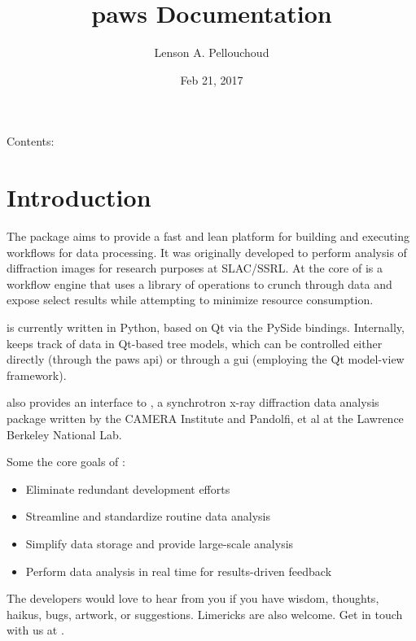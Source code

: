 \documentclass[letterpaper,10pt,english]{sphinxmanual}
\title{paws Documentation}
\date{Feb 21, 2017}
\author{Lenson A. Pellouchoud}
\begin{document}
\maketitle
\sphinxtableofcontents
{}\label{\detokenize{index::doc}}


Contents:


\chapter{Introduction}
\label{\detokenize{intro:introduction}}\label{\detokenize{intro:paws-the-platform-for-automated-workflows-by-ssrl}}\label{\detokenize{intro::doc}}\label{\detokenize{intro:ch-introduction}}
The  package aims to provide
a fast and lean platform for building and executing workflows for data processing.
It was originally developed to perform analysis of diffraction images
for research purposes at SLAC/SSRL.
At the core of  is a workflow engine
that uses a library of operations
to crunch through data and expose select results
while attempting to minimize resource consumption.

 is currently written in Python,
based on Qt via the PySide bindings.
Internally,  keeps track of data in Qt-based tree models,
which can be controlled either directly (through the paws api)
or through a gui (employing the Qt model-view framework).

 also provides an interface to ,
a synchrotron x-ray diffraction data analysis package
written by the CAMERA Institute and
Pandolfi, et al at the Lawrence Berkeley National Lab.

Some the core goals of :
\begin{itemize}
\item {} 
Eliminate redundant development efforts

\item {} 
Streamline and standardize routine data analysis

\item {} 
Simplify data storage and provide large-scale analysis

\item {} 
Perform data analysis in real time for results-driven feedback

\end{itemize}

The  developers would love to hear from you
if you have wisdom, thoughts, haikus, bugs, artwork, or suggestions.
Limericks are also welcome.
Get in touch with us at .
\end{document}
